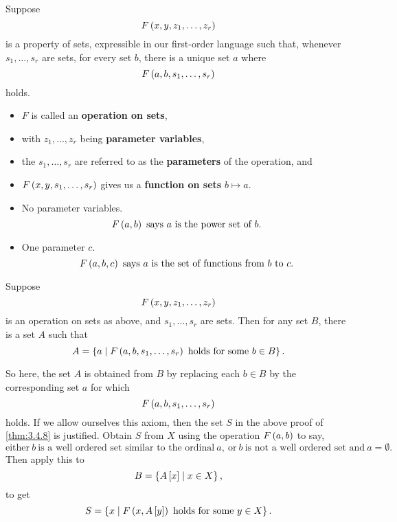 \pagebreak

\begin{definition}
\label{def:3.4.9}
Suppose
$$ F\left( x, y, z_1, \dots, z_r \right) $$
is a property of sets, expressible in our first-order language such that, whenever $ s_1, \dots, s_r $ are sets, for every set $ b $, there is a unique set $ a $ where
$$ F\left( a, b, s_1, \dots, s_r \right) $$
holds.
\begin{itemize}
\item $ F $ is called an \textbf{operation on sets},
\item with $ z_1, \dots, z_r $ being \textbf{parameter variables},
\item the $ s_1, \dots, s_r $ are referred to as the \textbf{parameters} of the operation, and
\item $ F\left( x, y, s_1, \dots, s_r \right) $ gives us a \textbf{function on sets} $ b \mapsto a $.
\end{itemize}
\end{definition}

\begin{example*}
\hfill
\begin{itemize}
\item No parameter variables.
$$ F\rb{a, b} \ \text{says} \ a \ \text{is the power set of} \ b. $$
\item One parameter $ c $.
$$ F\left( a, b, c \right) \ \text{says} \ a \ \text{is the set of functions from} \ b \ \text{to} \ c. $$
\end{itemize}
\end{example*}

\begin{axiom}
Suppose
$$ F\left( x, y, z_1, \dots, z_r \right) $$
is an operation on sets as above, and $ s_1, \dots, s_r $ are sets. Then for any set $ B $, there is a set $ A $ such that
$$ A = \left\{ a \mid F\left( a, b, s_1, \dots, s_r \right) \ \text{holds for some} \ b \in B \right\}. $$
\end{axiom}

So here, the set $ A $ is obtained from $ B $ by replacing each $ b \in B $ by the corresponding set $ a $ for which
$$ F\left( a, b, s_1, \dots, s_r \right) $$
holds. If we allow ourselves this axiom, then the set $ S $ in the above proof of \ref{thm:3.4.8} is justified. Obtain $ S $ from $ X $ using the operation $ F\left( a, b \right) $ to say,
$$ \text{either} \ b \ \text{is a well ordered set similar to the ordinal} \ a, \ \text{or} \ b \ \text{is not a well ordered set and} \ a = \emptyset. $$
Then apply this to
$$ B = \left\{ A\left[ x \right] \mid x \in X \right\}, $$
to get
$$ S = \left\{ x \mid F\left( x, A\left[ y \right] \right) \ \text{holds for some} \ y \in X \right\}. $$

